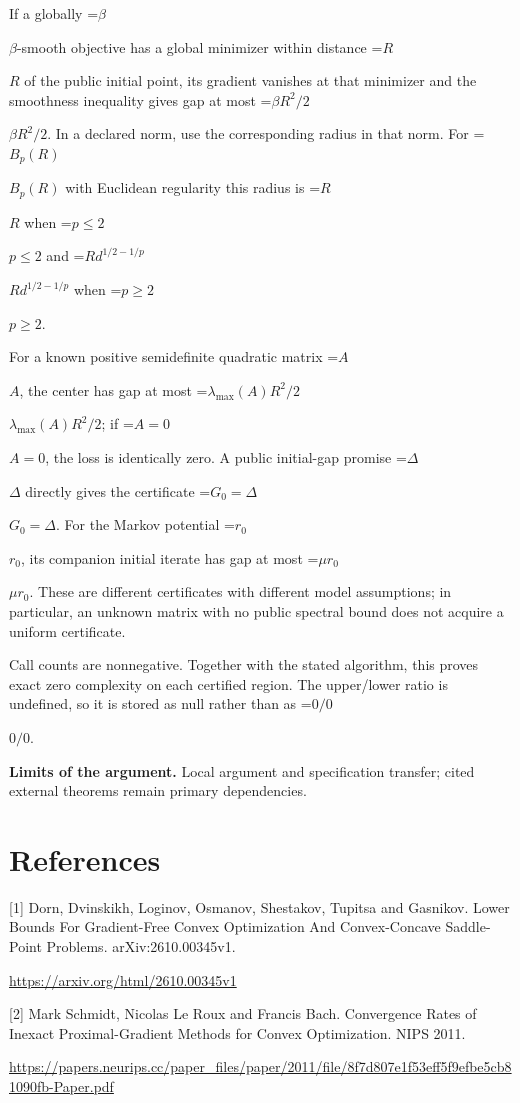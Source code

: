 \documentclass[10pt,a4paper]{article}
\newcommand{\AtlasMath}[1]{\par\begingroup\centering\setbox0=\hbox{$\displaystyle #1$}\ifdim\wd0>1.4\linewidth\typeout{ATLAS WIDE FORMULA: \the\wd0}\fi\ifdim\wd0>\linewidth\resizebox{\linewidth}{!}{\box0}\else\box0\fi\par\endgroup}
\newcommand{\AtlasInlineMath}[1]{\begingroup\setbox0=\hbox{$#1$}\ifdim\wd0>.4\linewidth\endgroup\AtlasMath{#1}\else\endgroup$#1$\fi}
\begin{document}
If a globally \AtlasInlineMath{\beta}-smooth objective has a global minimizer within distance \AtlasInlineMath{R} of the public initial point, its gradient vanishes at that minimizer and the smoothness inequality gives gap at most \AtlasInlineMath{\beta R^2/2}. In a declared norm, use the corresponding radius in that norm. For \AtlasInlineMath{B_p(R)} with Euclidean regularity this radius is \AtlasInlineMath{R} when \AtlasInlineMath{p\le2} and \AtlasInlineMath{R d^{1/2-1/p}} when \AtlasInlineMath{p\ge2}.

For a known positive semidefinite quadratic matrix \AtlasInlineMath{A}, the center has gap at most \AtlasInlineMath{\lambda_{\max}(A)R^2/2}; if \AtlasInlineMath{A=0}, the loss is identically zero. A public initial-gap promise \AtlasInlineMath{\Delta} directly gives the certificate \AtlasInlineMath{G_0=\Delta}. For the Markov potential \AtlasInlineMath{r_0}, its companion initial iterate has gap at most \AtlasInlineMath{\mu r_0}. These are different certificates with different model assumptions; in particular, an unknown matrix with no public spectral bound does not acquire a uniform certificate.

Call counts are nonnegative. Together with the stated algorithm, this proves exact zero complexity on each certified region. The upper/lower ratio is undefined, so it is stored as null rather than as \AtlasInlineMath{0/0}.

\textbf{Limits of the argument.} Local argument and specification transfer; cited external theorems remain primary dependencies.

\section{References}
[1] Dorn, Dvinskikh, Loginov, Osmanov, Shestakov, Tupitsa and Gasnikov. Lower Bounds For Gradient-Free Convex Optimization And Convex-Concave Saddle-Point Problems. arXiv:2610.00345v1.

\url{https://arxiv.org/html/2610.00345v1}

[2] Mark Schmidt, Nicolas Le Roux and Francis Bach. Convergence Rates of Inexact Proximal-Gradient Methods for Convex Optimization. NIPS 2011.

\url{https://papers.neurips.cc/paper_files/paper/2011/file/8f7d807e1f53eff5f9efbe5cb81090fb-Paper.pdf}
\end{document}
